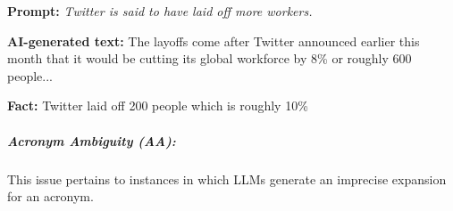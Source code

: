 \vspace{-3mm}
\begin{tcolorbox}[enhanced,attach boxed title to top right={yshift=-2.5mm,yshifttext=-1mm},
left=1pt,right=1pt,top=1pt,bottom=1pt,  colback=blue!5!white,colframe=blue!75!black,colbacktitle=violet!80!black,
  title=moderate,fonttitle=\ttfamily\bfseries\scshape\fontsize{9}{9.6}\selectfont,
  boxed title style={size=small,colframe=violet!50!black} ]
  \begin{spacing}{0.75}
  \textbf{\scriptsize Prompt:} \textit{\scriptsize 
  Twitter is said to have laid off more workers.}
 \end{spacing}

  \vspace{-2mm}
  \DrawLine

  \begin{spacing}{0.75}
  \textbf{\scriptsize  AI-generated text:} {\scriptsize\selectfont
  The layoffs come after Twitter announced earlier this month that it would be cutting its global workforce by 8\% or roughly 600 people...}
  \end{spacing}

  \vspace{-2mm}
  \DrawLine

  \textbf{\scriptsize  Fact:} \scriptsize Twitter laid off 200 people which is roughly 10\%

\end{tcolorbox}
\vspace{-4mm}

\subparagraph{Acronym Ambiguity (AA):} This issue pertains to instances in which LLMs generate an imprecise expansion for an acronym. 


